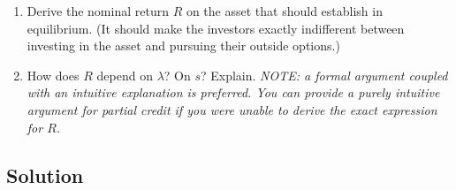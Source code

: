 \documentclass[a4paper]{article}
\newif\ifsolutions
\begin{document}
	\begin{enumerate}
		\item Derive the nominal return $R$ on the asset that should establish in equilibrium. (It should make the investors exactly indifferent between investing in the asset and pursuing their outside options.)
		
		\item How does $R$ depend on $\lambda$? On $s$? Explain.
		\emph{NOTE: a formal argument coupled with an intuitive explanation is preferred. You can provide a purely intuitive argument for partial credit if you were unable to derive the exact expression for $R$.}
	\end{enumerate}


\ifsolutions
\subsection*{Solution}
\end{document}
